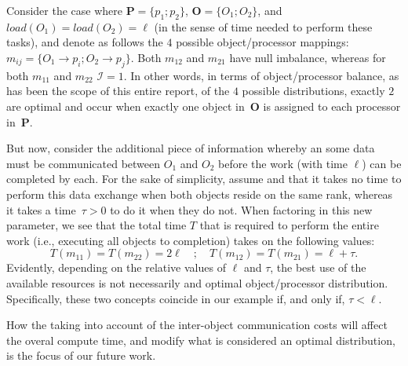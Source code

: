 Consider the case where $\mathbf{P}=\{p_1;p_2\}$,
$\mathbf{O}=\{O_1;O_2\}$, and $load(O_1)=load(O_2)=\ell$ (in the sense
of time needed to perform these tasks), and denote
as follows the $4$ possible object/processor mappings:
$m_{ij}=\{O_1\to{p_i};O_2\to{p_j}\}$.
Both $m_{12}$ and $m_{21}$ have null imbalance, whereas for both
$m_{11}$ and $m_{22}$ $\mathcal{I}=1$.
In other words, in terms of object/processor balance, as has
been the scope of this entire report, of the $4$ possible
distributions, exactly $2$ are optimal and occur when exactly one
object in~$\mathbf{O}$ is assigned to each processor in~$\mathbf{P}$.

But now, consider the additional piece of information whereby an
some data must be communicated between $O_1$ and $O_2$ before the
work (with time $\ell$) can be completed by each.
For the sake of simplicity, assume and that it takes no time to
perform this data exchange when both objects reside on the same rank,
whereas it takes a time~$\tau>0$ to do it when they do not.
When factoring in this new parameter, we see that the total time $T$
that is required to perform the entire work (i.e., executing all
objects to completion) takes on the following values:
\[
T(m_{11}) = T(m_{22}) = 2\ell
\quad;\quad
T(m_{12}) = T(m_{21}) = \ell + \tau.
\]
Evidently, depending on the relative values of $\ell$ and $\tau$, the
best use of the available resources is not necessarily and optimal
object/processor distribution.
Specifically, these two concepts coincide in our example if, and only
if, $\tau<\ell$.

How the taking into account of the inter-object communication costs
will affect the overal compute time, and modify what is considered an
optimal distribution, is the focus of our future work.
